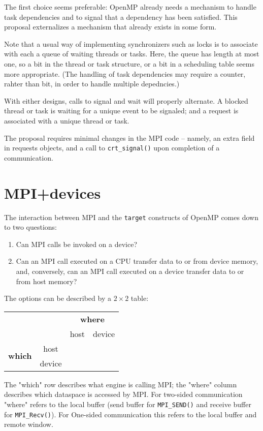 \documentclass[twoside,11pt]{article}
\begin{document}
The first choice seems preferable: OpenMP already needs a mechanism to handle 
task dependencies and to signal that a dependency has been satisfied. This 
proposal externalizes a mechanism that already exists in some form. 
 
Note that a usual way of implementing synchronizers such as locks is to 
associate with each a queue of waiting threads or tasks. Here, the queue has 
length at most one, so a bit in the thread or task structure, or a bit in a 
scheduling table seems more appropriate. (The handling of task dependencies may 
require a counter, rahter than bit, in order to handle multiple depedncies.) 

With either designs, calls to signal 
and wait will properly alternate. A blocked thread or task is waiting for a 
unique event to be signaled; and a request is associated with a unique thread 
or task.

The proposal requires minimal changes in the MPI code -- namely, an extra field 
in requests objects, and a call to \texttt{crt\_signal()} upon completion of a 
communication.

\section{MPI+devices}

The interaction between MPI and the \texttt{target} constructs of OpenMP comes 
down to two questions:
\begin{enumerate}
	\item 
	Can MPI calls be invoked on a device?
	\item 
	Can an MPI call executed on a CPU transfer data to or from device memory, 
	and, conversely, can an MPI call executed on a device transfer data to or 
	from host memory?
\end{enumerate}

The options can be described by a $2\times 2$ table:

\begin{tabular}{|c|c|c|c|}
	\cline{3-4}
	\multicolumn{2}{c|}{} & \multicolumn{2}{c|}{\textbf{where}} \\
	\cline{3-4}
	\multicolumn{2}{c|}{} & host & device \\
	\hline
	\multirow{2}{30 pt}{\textbf{which}} & host & & \\
    \cline{2-4}
	& device & & \\
	\hline
\end{tabular}

The "which" row describes what engine is calling MPI; the "where" column 
describes which dataspace is accessed by MPI. For two-sided communication 
"where" refers to the local buffer (send buffer for \texttt{MPI\_SEND()} and 
receive buffer for \texttt{MPI\_Recv()}). For One-sided communication this 
refers to the local buffer and remote window.
\end{document}
